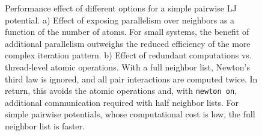 \documentclass[anonymous,sigconf,9pt]{acmart}
\begin{document}
\begin{figure}[tbp]
\caption{Performance effect of different options for a simple pairwise LJ potential. a) Effect of exposing parallelism over neighbors as a function of the number of atoms. For small systems, the benefit of additional parallelism outweighs the reduced efficiency of the more complex iteration pattern. b) Effect of redundant computations vs. thread-level atomic operations. With a full neighbor list, Newton's third law is ignored, and all pair interactions are computed twice. In return, this avoids the atomic operations and, with \texttt{newton on}, additional communication required with half neighbor lists. For simple pairwise potentials, whose computational cost is low, the full neighbor list is faster.}\label{fig:pair}
\end{figure}
\end{document}

